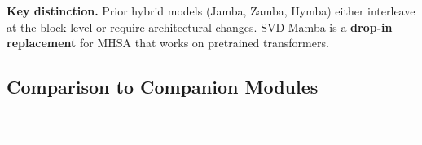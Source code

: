 \textbf{Key distinction.} Prior hybrid models (Jamba, Zamba, Hymba) either 
interleave at the block level or require architectural changes. SVD-Mamba 
is a \textbf{drop-in replacement} for MHSA that works on pretrained transformers.

\subsection{Comparison to Companion Modules}

\begin{lstlisting}

---
\end{lstlisting}